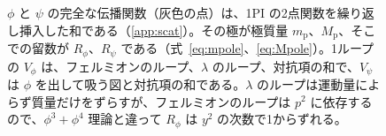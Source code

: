 \documentclass[a4paper,10pt]{ltjsarticle}
\begin{document}
\begin{figure}[tbp]
\caption{$\phi$ と $\psi$ の完全な伝播関数（灰色の点）は、1PI の2点関数を繰り返し挿入した和である（\ref{app:scat}）。その極が極質量 $m_{\mathrm p}$、$M_{\mathrm p}$、そこでの留数が $R_\phi$、$R_\psi$ である（式~\eqref{eq:mpole}、\eqref{eq:Mpole}）。1ループの $V_\phi$ は、フェルミオンのループ、$\lambda$ のループ、対抗項の和で、$V_\psi$ は $\phi$ を出して吸う図と対抗項の和である。$\lambda$ のループは運動量によらず質量だけをずらすが、フェルミオンのループは $p^2$ に依存するので、$\phi^3+\phi^4$ 理論と違って $R_\phi$ は $y^2$ の次数で1からずれる。}
\label{fig:dyson}
\end{figure}
\end{document}
